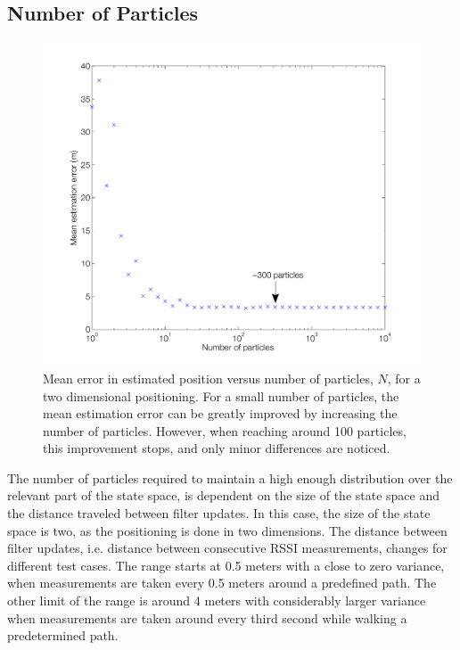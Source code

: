 \documentclass{LTHthesis}
\begin{document}
\subsection{Number of Particles}
%
\begin{figure}[!hbt]

\includegraphics[width=1\textwidth ]{images/pure_rssi/err_vs_N}
\caption{Mean error in estimated position versus number of particles, $N$, for a two dimensional positioning. For a small number of particles, the mean estimation error can be greatly improved by increasing the number of particles. However, when reaching around 100 particles, this improvement stops, and only minor differences are noticed.}\label{err_vs_N}
\end{figure}

The number of particles required to maintain a high enough distribution over the relevant part of the state space, is dependent on the size of the state space and the distance traveled between filter updates. In this case, the size of the state space is two,  as the positioning is done in two dimensions. The distance  between filter updates, i.e. distance between consecutive RSSI measurements, changes for different test cases. The range starts at 0.5 meters with a close to zero variance, when measurements are taken every 0.5 meters around a predefined path. The other limit of the range is around 4 meters with considerably larger variance when measurements are taken around every third second while walking a predetermined path. 
\end{document}
